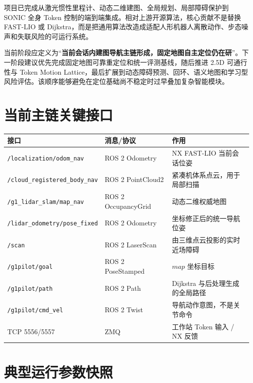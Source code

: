 \documentclass[11pt,a4paper,fontset=none]{ctexart}
\begin{document}
项目已完成从激光惯性里程计、动态二维建图、全局规划、局部障碍保护到 SONIC 全身 Token 控制的端到端集成。相对上游开源算法，核心贡献不是替换 FAST-LIO 或 Dijkstra，而是把通用算法改造成适配人形机器人离散动作、步态噪声和失联风险的可运行系统。

当前阶段应定义为“\textbf{当前会话内建图导航主链形成，固定地图自主定位仍在研}”。下一阶段建议优先完成固定地图可靠重定位和统一评测基线，随后推进 2.5D 可通行性与 Token Motion Lattice，最后扩展到动态障碍预测、回环、语义地图和学习型风险评估。该顺序能够避免在定位基础尚不稳定时过早叠加复杂智能模块。

\appendix
\section{当前主链关键接口}

\begin{longtable}{>{\raggedright\arraybackslash}p{4.3cm} >{\raggedright\arraybackslash}p{3.4cm} >{\raggedright\arraybackslash}p{6.2cm}}
\toprule
接口 & 消息/协议 & 作用 \\
\midrule
\nolinkurl{/localization/odom_nav} & ROS 2 Odometry & NX FAST-LIO 当前会话位姿 \\
\nolinkurl{/cloud_registered_body_nav} & ROS 2 PointCloud2 & 紧凑机体系点云，用于局部扫描 \\
\nolinkurl{/g1_lidar_slam/map_nav} & ROS 2 OccupancyGrid & 动态二维权威地图 \\
\nolinkurl{/lidar_odometry/pose_fixed} & ROS 2 Odometry & 坐标修正后的统一导航位姿 \\
\nolinkurl{/scan} & ROS 2 LaserScan & 由三维点云投影的实时近场障碍 \\
\nolinkurl{/g1pilot/goal} & ROS 2 PoseStamped & $map$ 坐标目标 \\
\nolinkurl{/g1pilot/path} & ROS 2 Path & Dijkstra 与后处理生成的全局路径 \\
\nolinkurl{/g1pilot/cmd_vel} & ROS 2 Twist & 导航动作意图，不是关节命令 \\
TCP 5556/5557 & ZMQ & 工作站 Token 输入 / NX 反馈 \\
\bottomrule
\end{longtable}

\section{典型运行参数快照}
\end{document}
